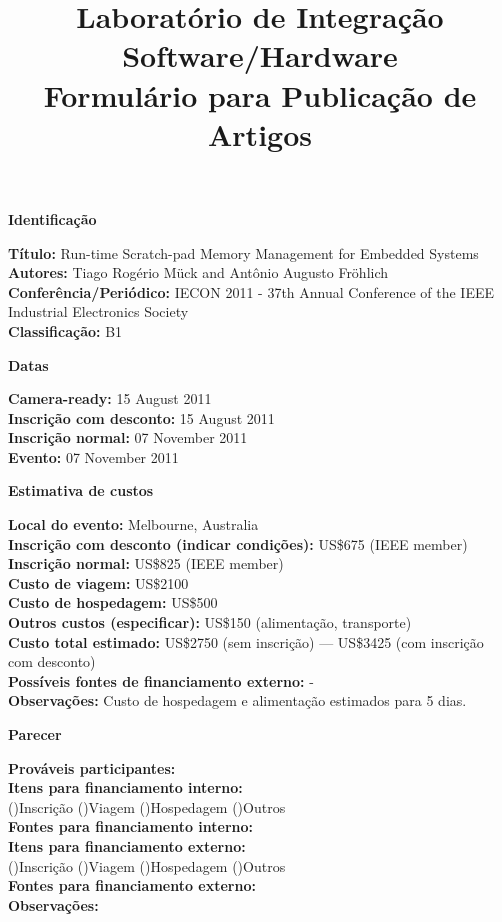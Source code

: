 \documentclass[10pt, a4paper]{article}
\title{Laboratório de Integração Software/Hardware \\
Formulário para Publicação de Artigos}
\date{}
\begin{document}
\maketitle

\begin{center}
\textbf{Identificação} \\
\end{center}
\textbf{Título:} Run-time Scratch-pad Memory Management for Embedded Systems \\
\textbf{Autores:} Tiago Rogério Mück and Antônio Augusto Fröhlich \\
\textbf{Conferência/Periódico:} IECON 2011 - 37th Annual Conference of the IEEE Industrial Electronics Society \\
\textbf{Classificação:} B1 \\

\begin{center}
\textbf{Datas}
\end{center}
\textbf{Camera-ready:} 15 August 2011 \\
\textbf{Inscrição com desconto:} 15 August 2011 \\
\textbf{Inscrição normal:}  07 November 2011 \\
\textbf{Evento:} 07 November 2011 \\

\begin{center}
\textbf{Estimativa de custos}
\end{center}
\textbf{Local do evento:} Melbourne, Australia \\
\textbf{Inscrição com desconto (indicar condições):} US\$675 (IEEE member)\\
\textbf{Inscrição normal:} US\$825 (IEEE member)  \\
\textbf{Custo de viagem:} US\$2100 \\
\textbf{Custo de hospedagem:} US\$500 \\
\textbf{Outros custos (especificar):} US\$150 (alimentação, transporte) \\
\textbf{Custo total estimado:} US\$2750 (sem inscrição) --- US\$3425 (com inscrição com desconto)\\
\textbf{Possíveis fontes de financiamento externo:} - \\
\textbf{Observações:} Custo de hospedagem e alimentação estimados para 5 dias. \\

\hrulefill

\begin{center}
\textbf{Parecer}
\end{center}
\textbf{Prováveis participantes:} \dotfill \\
\textbf{Itens para financiamento interno:} \\
()Inscrição ()Viagem ()Hospedagem ()Outros \\
\textbf{Fontes para financiamento interno:} \dotfill \\
\textbf{Itens para financiamento externo:} \\
()Inscrição ()Viagem ()Hospedagem ()Outros \\
\textbf{Fontes para financiamento externo:} \dotfill \\
\textbf{Observações:} \dotfill \\
\end{document}
